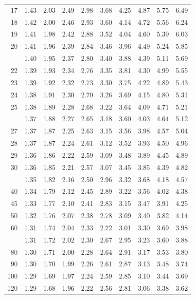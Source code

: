 \documentclass[10pt]{article}
\begin{document}
\begin{longtable}{@{}r!{\vrule width 0.8pt\hspace{0.55em}}rrrrrrrrr@{}}
17 & 1.43 & 2.03 & 2.49 & 2.98 & 3.68 & 4.25 & 4.87 & 5.75 & 6.49 \\
18 & 1.42 & 2.00 & 2.46 & 2.93 & 3.60 & 4.14 & 4.72 & 5.56 & 6.24 \\
19 & 1.41 & 1.98 & 2.42 & 2.88 & 3.52 & 4.04 & 4.60 & 5.39 & 6.03 \\
20 & 1.41 & 1.96 & 2.39 & 2.84 & 3.46 & 3.96 & 4.49 & 5.24 & 5.85 \\
 & 1.40 & 1.95 & 2.37 & 2.80 & 3.40 & 3.88 & 4.39 & 5.11 & 5.69 \\
22 & 1.39 & 1.93 & 2.34 & 2.76 & 3.35 & 3.81 & 4.30 & 4.99 & 5.55 \\
23 & 1.39 & 1.92 & 2.32 & 2.73 & 3.30 & 3.75 & 4.22 & 4.89 & 5.43 \\
24 & 1.38 & 1.91 & 2.30 & 2.70 & 3.26 & 3.69 & 4.15 & 4.80 & 5.31 \\
25 & 1.38 & 1.89 & 2.28 & 2.68 & 3.22 & 3.64 & 4.09 & 4.71 & 5.21 \\
 & 1.37 & 1.88 & 2.27 & 2.65 & 3.18 & 3.60 & 4.03 & 4.64 & 5.12 \\
27 & 1.37 & 1.87 & 2.25 & 2.63 & 3.15 & 3.56 & 3.98 & 4.57 & 5.04 \\
28 & 1.37 & 1.87 & 2.24 & 2.61 & 3.12 & 3.52 & 3.93 & 4.50 & 4.96 \\
29 & 1.36 & 1.86 & 2.22 & 2.59 & 3.09 & 3.48 & 3.89 & 4.45 & 4.89 \\
30 & 1.36 & 1.85 & 2.21 & 2.57 & 3.07 & 3.45 & 3.85 & 4.39 & 4.82 \\
 & 1.35 & 1.82 & 2.16 & 2.50 & 2.96 & 3.32 & 3.68 & 4.18 & 4.57 \\
40 & 1.34 & 1.79 & 2.12 & 2.45 & 2.89 & 3.22 & 3.56 & 4.02 & 4.38 \\
45 & 1.33 & 1.77 & 2.10 & 2.41 & 2.83 & 3.15 & 3.47 & 3.91 & 4.25 \\
50 & 1.32 & 1.76 & 2.07 & 2.38 & 2.78 & 3.09 & 3.40 & 3.82 & 4.14 \\
60 & 1.31 & 1.74 & 2.04 & 2.33 & 2.72 & 3.01 & 3.30 & 3.69 & 3.98 \\
 & 1.31 & 1.72 & 2.02 & 2.30 & 2.67 & 2.95 & 3.23 & 3.60 & 3.88 \\
80 & 1.30 & 1.71 & 2.00 & 2.28 & 2.64 & 2.91 & 3.17 & 3.53 & 3.80 \\
90 & 1.30 & 1.70 & 1.99 & 2.26 & 2.61 & 2.87 & 3.13 & 3.48 & 3.74 \\
100 & 1.29 & 1.69 & 1.97 & 2.24 & 2.59 & 2.85 & 3.10 & 3.44 & 3.69 \\
120 & 1.29 & 1.68 & 1.96 & 2.22 & 2.56 & 2.81 & 3.06 & 3.38 & 3.62 \\

\end{longtable}
\end{document}
